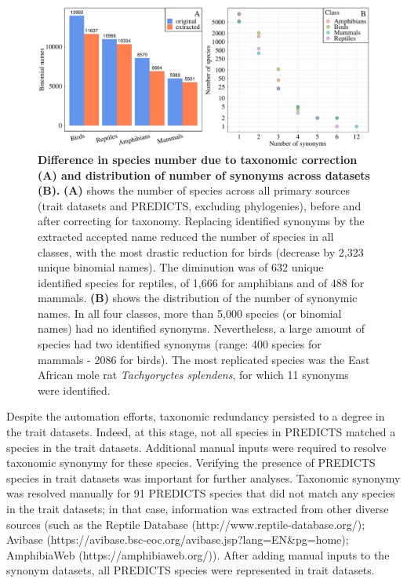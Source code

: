 \vspace{0.5cm}
\begin{figure}[h!]
\includegraphics[scale=0.45]{figures/chapter2/Taxonomic_corrections/tax_corrections}
\caption[Difference in species number due to taxonomic correction (A) and distribution of number of synonyms across datasets (B)]{\textbf{Difference in species number due to taxonomic correction (A) and distribution of number of synonyms across datasets (B).} \textbf{(A)} shows the number of species across all primary sources (trait datasets and PREDICTS, excluding phylogenies), before and after correcting for taxonomy. Replacing identified synonyms by the extracted accepted name reduced the number of species in all classes, with the most drastic reduction for birds (decrease by 2,323 unique binomial names). The diminution was of 632 unique identified species for reptiles, of 1,666 for amphibians and of 488 for mammals. \textbf{(B)} shows the distribution of the number of synonymic names. In all four classes, more than 5,000 species (or binomial names) had no identified synonyms. Nevertheless, a large amount of species had two identified synonyms (range: 400 species for mammals - 2086 for birds). The most replicated species was the East African mole rat \textit{Tachyoryctes splendens}, for which 11 synonyms were identified.}
\label{taxcor}
\end{figure}

Despite the automation efforts, taxonomic redundancy persisted to a degree in the trait datasets. Indeed, at this stage, not all species in PREDICTS matched a species in the trait datasets. Additional manual inputs were required to resolve taxonomic synonymy for these species. Verifying the presence of PREDICTS species in trait datasets was important for further analyses. Taxonomic synonymy was resolved manually for 91 PREDICTS species that did not match any species in the trait datasets; in that case, information was extracted from other diverse sources (such as the Reptile Database (http://www.reptile-database.org/); Avibase (https://avibase.bsc-eoc.org/avibase.jsp?lang=EN\&pg=home); AmphibiaWeb (https://amphibiaweb.org/)). After adding manual inputs to the synonym datasets, all PREDICTS species were represented in trait datasets. 

